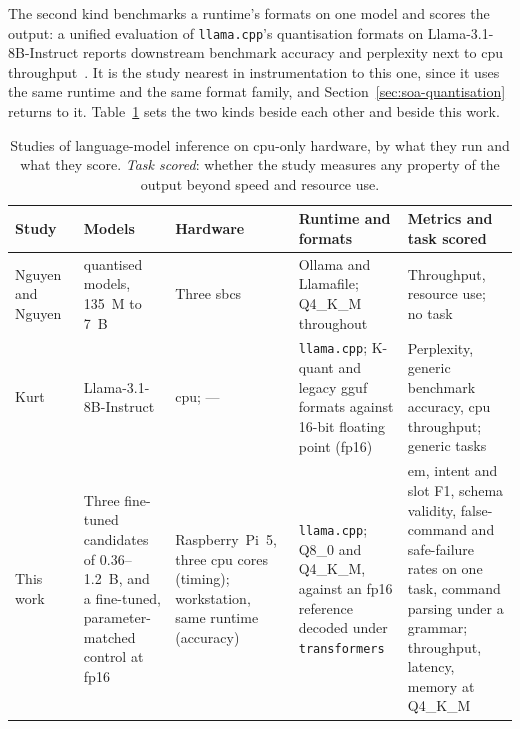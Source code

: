 The second kind benchmarks a runtime's formats on one model and scores the output: a unified
evaluation of \texttt{llama.cpp}'s quantisation formats on Llama-3.1-8B-Instruct reports downstream
benchmark accuracy and perplexity next to \gls{cpu} throughput~\cite{kurt2026}. It is the study
nearest in instrumentation to this one, since it uses the same runtime and the same format family,
and Section~\ref{sec:soa-quantisation} returns to it. Table~\ref{tab:soa-edge} sets the two kinds
beside each other and beside this work.

\begin{table}[htbp]
\centering
\footnotesize
\caption[Studies of language-model inference without an accelerator]{Studies of language-model
inference on \gls{cpu}-only hardware, by what they run and what they score. \emph{Task scored}:
whether the study measures any property of the output beyond speed and resource use.}
\label{tab:soa-edge}
\begin{tabularx}{\textwidth}{@{}>{\raggedright\arraybackslash}p{2.3cm} >{\raggedright\arraybackslash}p{2.4cm} >{\raggedright\arraybackslash}p{2.5cm} >{\raggedright\arraybackslash}X >{\raggedright\arraybackslash}X@{}}
\toprule
Study & Models & Hardware & Runtime and formats & Metrics and task scored \\
\midrule
Nguyen and Nguyen~\cite{sbc2025} & 25 quantised models, 135~M to 7~B & Three \glspl{sbc} & Ollama and Llamafile; Q4\_K\_M throughout & Throughput, resource use; no task \\
Kurt~\cite{kurt2026} & Llama-3.1-8B-Instruct & \gls{cpu}; --- & \texttt{llama.cpp}; K-quant and legacy \gls{gguf} formats against 16-bit floating point (fp16) & Perplexity, generic benchmark accuracy, \gls{cpu} throughput; generic tasks \\
\midrule
This work & Three fine-tuned candidates of 0.36--1.2~B, and a fine-tuned, parameter-matched control at fp16 & Raspberry~Pi~5, three \gls{cpu} cores (timing); workstation, same runtime (accuracy) & \texttt{llama.cpp}; Q8\_0 and Q4\_K\_M, against an fp16 reference decoded under \texttt{transformers} & \gls{em}, intent and slot F1, schema validity, false-command and safe-failure rates on one task, command parsing under a grammar; throughput, latency, memory at Q4\_K\_M \\
\bottomrule
\end{tabularx}
\end{table}

